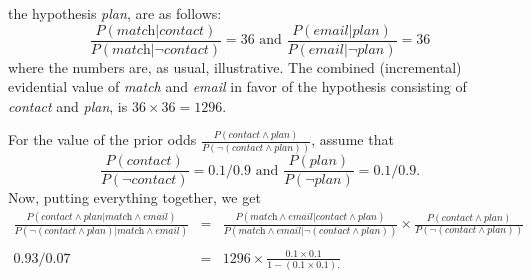 \documentclass[10pt]{article}
\begin{document}
the hypothesis \textit{plan}, are as follows:
%
\[\frac{P(\textit{match}| \textit{contact})}{P(\textit{match} | \neg \textit{contact})}=36 \text{ and } \frac{P(\textit{email}| \textit{plan})}{P(\textit{email}| \neg \textit{plan})}=36\]
%
where the numbers are, as usual, illustrative. The combined (incremental) evidential value of \textit{match} and \textit{email} 
in favor of the hypothesis consisting of \textit{contact} and \textit{plan}, is $36\times 36 = 1296$.
%

  \noindent
For the value of the prior odds $\frac{P(\textit{contact}\wedge \textit{plan})}{P(\neg (\textit{contact} \wedge \textit{plan}))}$, assume that 
%
\[\frac{P(\textit{contact})}{P(\neg \textit{contact})}=0.1/0.9 \text{ and } \frac{P(\textit{plan})}{P(\neg \textit{plan})}=0.1/0.9.\]
%
Now, putting everything together, we get
 \begin{eqnarray*} %
 \frac{P(\textit{contact}\wedge \textit{plan} | \textit{match} \wedge \textit{email})}{P(\neg (\textit{contact} \wedge \textit{plan}) |  \textit{match} \wedge \textit{email})} 
 & = & \frac{P(\textit{match} \wedge \textit{email} | \textit{contact}\wedge \textit{plan})}{P(\textit{match} \wedge \textit{email} | \neg (\textit{contact} \wedge \textit{plan}))}  \times 
\frac{P(\textit{contact}\wedge \textit{plan})}{P(\neg (\textit{contact} \wedge \textit{plan}))} \\ 
 &&\\
0.93/0.07 & = & 1296  \times  \frac{0.1\times 0.1}{1-(0.1\times 0.1).}
 \end{eqnarray*} %
\end{document}
